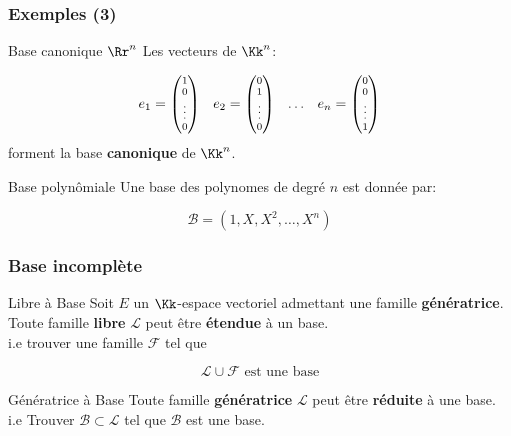 \documentclass[dvipsnames]{beamer}
\begin{document}
\begin{frame}[t]
  \frametitle{Exemples (3)}
  
  \begin{block}{Base canonique $\Rr^n$}
   Les vecteurs de $\Kk^n$:

   \begin{equation*}
     \scriptsize
     e_1 = \begin{pmatrix}
       1\\0\\ \vdots\\ 0
     \end{pmatrix}
     \quad
     e_2 = \begin{pmatrix}
       0\\1\\ \vdots\\ 0
     \end{pmatrix}
     \quad 
     \ldots
     \quad 
     e_n = \begin{pmatrix}
       0\\0\\ \vdots\\ 1
     \end{pmatrix}
   \end{equation*}
   forment la base \textbf{\alert{canonique}} de $\Kk^n$.
  \end{block}
  \pause

  \begin{block}{Base polynômiale}
   Une base des polynomes de degré $n$ est donnée par:

   \begin{equation*}
     \mathcal{B}  = (1, X, X^2, \ldots, X^n)
   \end{equation*}
  \end{block}
\end{frame}
\begin{frame}[t]
  \frametitle{Base incomplète}
 \begin{block}{Libre à Base}
   \small
  Soit $E$ un $\Kk$-espace vectoriel admettant une famille
  \textbf{génératrice}.\\

    Toute famille \textbf{libre} $\mathcal{L}$ peut être
    \textbf{\alert{étendue}} à un base.\\[4pt]
      i.e trouver une famille
      $\mathcal{F}$ tel que

      \begin{equation*}
        \mathcal{L} \cup \mathcal{F} \text{ est une base}
      \end{equation*}
    \end{block}

    \pause
    \begin{block}{Génératrice à Base}
      \small
    Toute famille \textbf{génératrice} $\mathcal{L}$  peut être
    \textbf{\alert{réduite}} à une base.\\[4pt]


      i.e Trouver $\mathcal{B} \subset \mathcal{L}$ tel que
      $\mathcal{B}$ est une base.
 \end{block} 
\end{frame}
\end{document}
